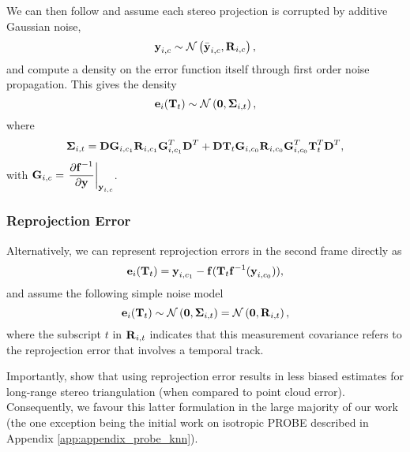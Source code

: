 \noindent We can then follow \cite{Maimone2007-tc} and assume each stereo projection is corrupted by additive Gaussian noise,
\begin{equation}
\boldsymbol{\mathbf{y}}_{i, c} \sim \mathcal{N}\left(\bar{\boldsymbol{\mathbf{y}}}_{i,c}, \boldsymbol{\mathbf{R}}_{i,c} \right), 
\end{equation}  
and compute a density on the error function itself through first order noise propagation. This gives the density
 \begin{equation}
  \boldsymbol{\mathbf{e}}_{i}(\boldsymbol{\mathbf{T}}_t) \sim
 \mathcal{N}\left(\boldsymbol{\mathbf{0}}, \boldsymbol{\mathbf{\Sigma}}_{i,t} \right), 
\end{equation}
where
\begin{equation}
	\boldsymbol{\mathbf{\Sigma}}_{i,t} = \boldsymbol{\mathbf{D}}\boldsymbol{\mathbf{G}}_{i,c_1} \boldsymbol{\mathbf{R}}_{i,c_1}  \boldsymbol{\mathbf{G}}_{i,c_1}^T \boldsymbol{\mathbf{D}}^T + 
 \boldsymbol{\mathbf{D}}\boldsymbol{\mathbf{T}}_t \boldsymbol{\mathbf{G}}_{i,c_0}  \boldsymbol{\mathbf{R}}_{i,c_0} \boldsymbol{\mathbf{G}}_{i,c_0}^T  \boldsymbol{\mathbf{T}}_t^T \boldsymbol{\mathbf{D}}^T,
\end{equation}
with
$\boldsymbol{\mathbf{G}}_{i,c} = \left.\dfrac{\partial \boldsymbol{\mathbf{f}}^{-1}}{\partial \boldsymbol{\mathbf{y}}}\right|_{\boldsymbol{\mathbf{y}}_{i, c}}$.

\subsubsection{Reprojection Error}
\label{sec:vo_reprojection}
Alternatively, we can represent reprojection errors in the second frame directly as
\begin{equation}
  \boldsymbol{\mathbf{e}}_{i}(\boldsymbol{\mathbf{T}}_t)  = \boldsymbol{\mathbf{y}}_{i, c_1} - \boldsymbol{\mathbf{f}}( \boldsymbol{\mathbf{T}}_t 
    \boldsymbol{\mathbf{f}}^{-1}( \boldsymbol{\mathbf{y}}_{i, c_0} ) ),
   \label{eq:image_error}
\end{equation}
\noindent and assume the following simple noise model
 \begin{equation}
  \boldsymbol{\mathbf{e}}_{i}(\boldsymbol{\mathbf{T}}_t) \sim \mathcal{N}\left(\boldsymbol{\mathbf{0}}, \boldsymbol{\mathbf{\Sigma}}_{i,t} \right) = 
 \mathcal{N}\left(\boldsymbol{\mathbf{0}},  \boldsymbol{\mathbf{R}}_{i,t}\right), 
\end{equation}
where the subscript $t$ in $\boldsymbol{\mathbf{R}}_{i,t}$ indicates that this measurement covariance refers to the reprojection error that involves a temporal track.

Importantly, \cite{Sibley2007} show that using reprojection error results in less biased estimates for long-range stereo triangulation (when compared to point cloud error). Consequently, we favour this latter formulation in the large majority of our work (the one exception being the initial work on isotropic PROBE described in Appendix \ref{app:appendix_probe_knn}).

